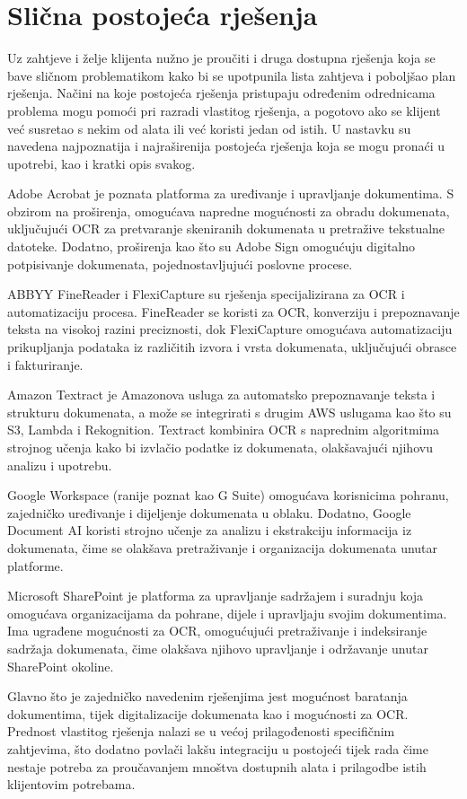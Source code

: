		\section{Slična postojeća rješenja}
		\par Uz zahtjeve i želje klijenta nužno je proučiti i druga dostupna rješenja koja se bave sličnom problematikom kako bi se upotpunila lista zahtjeva i poboljšao plan rješenja. Načini na koje postojeća rješenja pristupaju određenim odrednicama problema mogu pomoći pri razradi vlastitog rješenja, a pogotovo ako se klijent već susretao s nekim od alata ili već koristi jedan od istih. U nastavku su navedena najpoznatija i najraširenija postojeća rješenja koja se mogu pronaći u upotrebi, kao i kratki opis svakog.
		\par Adobe Acrobat je poznata platforma za uređivanje i upravljanje dokumentima. S obzirom na proširenja, omogućava napredne mogućnosti za obradu dokumenata, uključujući OCR za pretvaranje skeniranih dokumenata u pretražive tekstualne datoteke. Dodatno, proširenja kao što su Adobe Sign omogućuju digitalno potpisivanje dokumenata, pojednostavljujući poslovne procese.
		\par ABBYY FineReader i FlexiCapture su rješenja specijalizirana za OCR i automatizaciju procesa. FineReader se koristi za OCR, konverziju i prepoznavanje teksta na visokoj razini preciznosti, dok FlexiCapture omogućava automatizaciju prikupljanja podataka iz različitih izvora i vrsta dokumenata, uključujući obrasce i fakturiranje.
		\par Amazon Textract je Amazonova usluga za automatsko prepoznavanje teksta i strukturu dokumenata, a može se integrirati s drugim AWS uslugama kao što su S3, Lambda i Rekognition. Textract kombinira OCR s naprednim algoritmima strojnog učenja kako bi izvlačio podatke iz dokumenata, olakšavajući njihovu analizu i upotrebu.
		\par Google Workspace (ranije poznat kao G Suite) omogućava korisnicima pohranu, zajedničko uređivanje i dijeljenje dokumenata u oblaku. Dodatno, Google Document AI koristi strojno učenje za analizu i ekstrakciju informacija iz dokumenata, čime se olakšava pretraživanje i organizacija dokumenata unutar platforme.
		\par Microsoft SharePoint je platforma za upravljanje sadržajem i suradnju koja omogućava organizacijama da pohrane, dijele i upravljaju svojim dokumentima. Ima ugrađene mogućnosti za OCR, omogućujući pretraživanje i indeksiranje sadržaja dokumenata, čime olakšava njihovo upravljanje i održavanje unutar SharePoint okoline.
		\par Glavno što je zajedničko navedenim rješenjima jest mogućnost baratanja dokumentima, tijek digitalizacije dokumenata kao i mogućnosti za OCR. Prednost vlastitog rješenja nalazi se u većoj prilagođenosti specifičnim zahtjevima, što dodatno povlači lakšu integraciju u postojeći tijek rada čime nestaje potreba za proučavanjem mnoštva dostupnih alata i prilagodbe istih klijentovim potrebama.
		\eject
